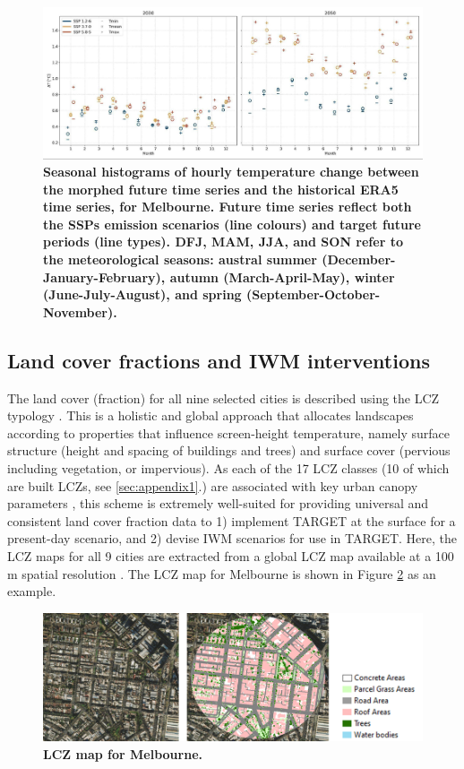 \documentclass[utf8]{frontiersSCNS} %
\begin{document}
\begin{figure}
\centering
\includegraphics[trim={0 0 0 0},clip,scale=0.25]{images/image3.jpg}
\caption{\bf Seasonal histograms of hourly temperature change between the morphed future time series and the historical ERA5 time series, for Melbourne. Future time series reflect both the SSPs emission scenarios (line colours) and target future periods (line types). DFJ, MAM, JJA, and SON refer to the meteorological seasons: austral summer (December-January-February), autumn (March-April-May), winter (June-July-August), and spring (September-October-November).}
 \label{fig:MelHist}
\end{figure}

\subsection{Land cover fractions and IWM interventions}\label{sec:lc}

The land cover (fraction) for all nine selected cities is described using the LCZ typology \citep{Stewart2012b}. This is a holistic and global approach that allocates landscapes according to properties that influence screen-height temperature, namely surface structure (height and spacing of buildings and trees) and surface cover (pervious including vegetation, or impervious). As each of the 17 LCZ classes (10 of which are built LCZs, see \ref{sec:appendix1}.) are associated with key urban canopy parameters \citep{Ching2018a}, this scheme is extremely well-suited for providing universal and consistent land cover fraction data to 1) implement TARGET at the surface for a present-day scenario, and 2) devise IWM scenarios for use in TARGET. Here, the LCZ maps for all 9 cities are extracted from a global LCZ map available at a 100 m spatial resolution \citep{Demuzere2022}. The LCZ map for Melbourne is shown in Figure \ref{fig:MelLCZ} as an example.

\begin{figure}
\centering
\includegraphics[trim={0 0 0 0},clip,scale=0.35]{images/image4.png}
\caption{\bf LCZ map for Melbourne.}
 \label{fig:MelLCZ}
\end{figure}
\end{document}
